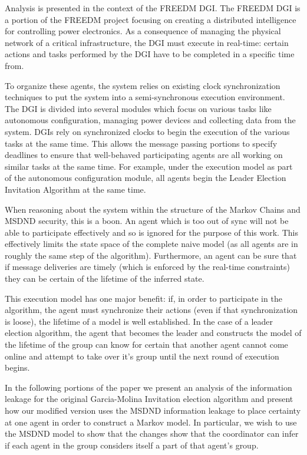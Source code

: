 Analysis is presented in the context of the \ac{FREEDM} \ac{DGI}. The \ac{FREEDM} \ac{DGI} is a portion of the \ac{FREEDM} project focusing on creating a distributed intelligence for controlling power electronics. As a consequence of managing the physical network of a critical infrastructure, the \ac{DGI} must execute in real-time: certain actions and tasks performed by the \ac{DGI} have to be completed in a specific time from.

To organize these agents, the system relies on existing clock synchronization techniques to put the system into a semi-synchronous execution environment. The \ac{DGI} is divided into several modules which focus on various tasks like autonomous configuration, managing power devices and collecting data from the system. \ac{DGI}s rely on synchronized clocks to begin the execution of the various tasks at the same time. This allows the message passing portions to specify deadlines to ensure that well-behaved participating agents are all working on similar tasks at the same time. For example, under the execution model as part of the autonomous configuration module, all agents begin the Leader Election Invitation Algorithm at the same time.

When reasoning about the system within the structure of the Markov Chains and MSDND security, this is a boon. An agent which is too out of sync will not be able to participate effectively and so is ignored for the purpose of this work. This effectively limits the state space of the complete naive model (as all agents are in roughly the same step of the algorithm). Furthermore, an agent can be sure that if message deliveries are timely (which is enforced by the real-time constraints) they can be certain of the lifetime of the inferred state.

This execution model has one major benefit: if, in order to participate in the algorithm, the agent must synchronize their actions (even if that synchronization is loose), the lifetime of a model is well established. In the case of a leader election algorithm, the agent that becomes the leader and constructs the model of the lifetime of the group can know for certain that another agent cannot come online and attempt to take over it's group until the next round of execution begins.

In the following portions of the paper we present an analysis of the information leakage for the original Garcia-Molina Invitation election algorithm and present how our modified version uses the MSDND information leakage to place certainty at one agent in order to construct a Markov model. In particular, we wish to use the MSDND model to show that the changes show that the coordinator can infer if each agent in the group considers itself a part of that agent's group.

